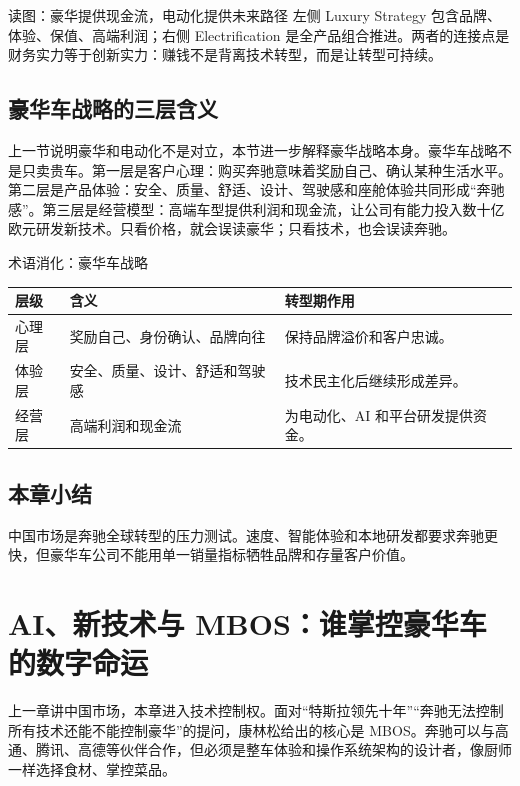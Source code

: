 \documentclass[a4paper]{article}
\begin{document}
\begin{knowledgebox}{读图：豪华提供现金流，电动化提供未来路径}
左侧 Luxury Strategy 包含品牌、体验、保值、高端利润；右侧 Electrification 是全产品组合推进。两者的连接点是财务实力等于创新实力：赚钱不是背离技术转型，而是让转型可持续。
\end{knowledgebox}

\subsection{豪华车战略的三层含义}

上一节说明豪华和电动化不是对立，本节进一步解释豪华战略本身。豪华车战略不是只卖贵车。第一层是客户心理：购买奔驰意味着奖励自己、确认某种生活水平。第二层是产品体验：安全、质量、舒适、设计、驾驶感和座舱体验共同形成“奔驰感”。第三层是经营模型：高端车型提供利润和现金流，让公司有能力投入数十亿欧元研发新技术。只看价格，就会误读豪华；只看技术，也会误读奔驰。

\begin{knowledgebox}{术语消化：豪华车战略}
\noindent\begin{tabularx}{\textwidth}{p{}p{}X}
\toprule
层级 & 含义 & 转型期作用 \\
\midrule
心理层 & 奖励自己、身份确认、品牌向往 & 保持品牌溢价和客户忠诚。 \\
体验层 & 安全、质量、设计、舒适和驾驶感 & 技术民主化后继续形成差异。 \\
经营层 & 高端利润和现金流 & 为电动化、AI 和平台研发提供资金。 \\
\bottomrule
\end{tabularx}
\end{knowledgebox}

\subsection{本章小结}

中国市场是奔驰全球转型的压力测试。速度、智能体验和本地研发都要求奔驰更快，但豪华车公司不能用单一销量指标牺牲品牌和存量客户价值。

\section{AI、新技术与 MBOS：谁掌控豪华车的数字命运}

上一章讲中国市场，本章进入技术控制权。面对“特斯拉领先十年”“奔驰无法控制所有技术还能不能控制豪华”的提问，康林松给出的核心是 MBOS。奔驰可以与高通、腾讯、高德等伙伴合作，但必须是整车体验和操作系统架构的设计者，像厨师一样选择食材、掌控菜品。
\end{document}
